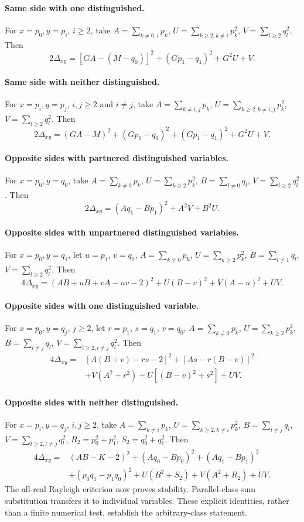 \documentclass[11pt]{article}
\numberwithin{equation}{section}
\theoremstyle{definition}\newtheorem{definition}[theorem]{Definition}\newtheorem{remark}[theorem]{Remark}
\begin{document}
\paragraph{Same side with one distinguished.}
For $x=p_0,y=p_i$, $i\ge2$, take $A=\sum_{k\ne0,i}p_k$, $U=\sum_{k\ge2,k\ne i}p_k^2$, $V=\sum_{l\ge2}q_l^2$. Then
\[
 2\Delta_{xy}=[GA-(M-q_0)]^2+(Gp_1-q_1)^2+G^2U+V.
\]
\paragraph{Same side with neither distinguished.}
For $x=p_i,y=p_j$, $i,j\ge2$ and $i\ne j$, take $A=\sum_{k\ne i,j}p_k$, $U=\sum_{k\ge2,k\ne i,j}p_k^2$, $V=\sum_{l\ge2}q_l^2$. Then
\[
 2\Delta_{xy}=(GA-M)^2+(Gp_0-q_0)^2+(Gp_1-q_1)^2+G^2U+V.
\]
\paragraph{Opposite sides with partnered distinguished variables.}
For $x=p_0,y=q_0$, take $A=\sum_{k\ne0}p_k$, $U=\sum_{k\ge2}p_k^2$, $B=\sum_{l\ne0}q_l$, $V=\sum_{l\ge2}q_l^2$. Then
\[
 2\Delta_{xy}=(Aq_1-Bp_1)^2+A^2V+B^2U.
\]
\paragraph{Opposite sides with unpartnered distinguished variables.}
For $x=p_0,y=q_1$, let $u=p_1$, $v=q_0$, $A=\sum_{k\ne0}p_k$, $U=\sum_{k\ge2}p_k^2$, $B=\sum_{l\ne1}q_l$, $V=\sum_{l\ge2}q_l^2$. Then
\[
 4\Delta_{xy}=(AB+uB+vA-uv-2)^2+U(B-v)^2+V(A-u)^2+UV.
\]
\paragraph{Opposite sides with one distinguished variable.}
For $x=p_0,y=q_j$, $j\ge2$, let $r=p_1$, $s=q_1$, $v=q_0$, $A=\sum_{k\ne0}p_k$, $U=\sum_{k\ge2}p_k^2$, $B=\sum_{l\ne j}q_l$, $V=\sum_{l\ge2,l\ne j}q_l^2$. Then
\begin{align*}
4\Delta_{xy}={}&[A(B+v)-rs-2]^2+[As-r(B-v)]^2\\
 &+V(A^2+r^2)+U[(B-v)^2+s^2]+UV.
\end{align*}
\paragraph{Opposite sides with neither distinguished.}
For $x=p_i,y=q_j$, $i,j\ge2$, take $A=\sum_{k\ne i}p_k$, $U=\sum_{k\ge2,k\ne i}p_k^2$, $B=\sum_{l\ne j}q_l$, $V=\sum_{l\ge2,l\ne j}q_l^2$, $R_2=p_0^2+p_1^2$, $S_2=q_0^2+q_1^2$. Then
\begin{align*}
4\Delta_{xy}={}&(AB-K-2)^2+(Aq_0-Bp_0)^2+(Aq_1-Bp_1)^2\\
 &+(p_0q_1-p_1q_0)^2+U(B^2+S_2)+V(A^2+R_2)+UV.
\end{align*}
The all-real Rayleigh criterion now proves stability. Parallel-class sum substitution transfers it to individual variables. These explicit identities, rather than a finite numerical test, establish the arbitrary-class statement.
\end{document}
